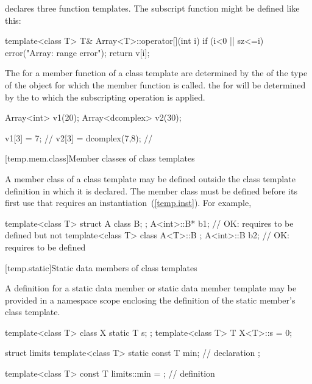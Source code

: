 declares three function templates.
The subscript function might be defined like this:

\begin{codeblock}
template<class T> T& Array<T>::operator[](int i) {
  if (i<0 || sz<=i) error("Array: range error");
  return v[i];
}
\end{codeblock}
\exitexample

\pnum
The
for a member function of a class template are determined by the
of the type of the object for which the member function is called.
\enterexample
the
for
will be determined by the
to which the subscripting operation is applied.

\begin{codeblock}
Array<int> v1(20);
Array<dcomplex> v2(30);

v1[3] = 7;                      // 
v2[3] = dcomplex(7,8);          // 
\end{codeblock}
\exitexample

[temp.mem.class]{Member classes of class templates}

\pnum
A member class of a class template may be defined outside the class template
definition in which it is declared.
\enternote
The member class must be defined before its first use that requires
an instantiation~(\ref{temp.inst}).
For example,

\begin{codeblock}
template<class T> struct A {
  class B;
};
A<int>::B* b1;                  // OK: requires  to be defined but not 
template<class T> class A<T>::B { };
A<int>::B  b2;                  // OK: requires  to be defined
\end{codeblock}
\exitnote

[temp.static]{Static data members of class templates}

\pnum
{}%
A definition for a static data member or static data member template may be
provided in a namespace scope enclosing the definition of the static member's
class template.
\enterexample

\begin{codeblock}
template<class T> class X {
  static T s;
};
template<class T> T X<T>::s = 0;

struct limits {
  template<class T>
    static const T min;           // declaration
};

template<class T>
  const T limits::min = { };      // definition
\end{codeblock}
\exitexample

